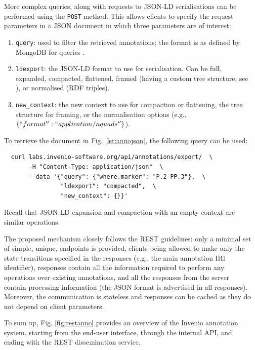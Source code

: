 More complex queries, along with requests to JSON-LD serialisations can be
performed using the \texttt{POST} method. This allows clients to specify the
request parameters in a JSON document in which three parameters are of interest:
\begin{enumerate}
  \item \texttt{query}: used to filter the retrieved annotations; the format is
                        as defined by MongoDB for queries \cite{ref:mongo}.
  \item \texttt{ldexport}: the JSON-LD format to use for serialisation. Can be
                           full, expanded, compacted, flattened, framed (having
                           a custom tree structure, see \cite{ref:jsonldframe}),
                           or normalised (RDF triples).
  \item \texttt{new\_context}: the new context to use for compaction or
                               flattening, the tree structure for framing, or
                               the normalisation options (e.g.,
                               $\{``format'': ``application/nquads''\}$).
\end{enumerate}

To retrieve the document in Fig. \ref{lst:annojson}, the following
query can be used:
\begin{verbatim}
  curl labs.invenio-software.org/api/annotations/export/  \
       -H "Content-Type: application/json"  \
       --data '{"query": {"where.marker": "P.2-PP.3"},  \
                "ldexport": "compacted",  \
                "new_context": {}}'
\end{verbatim}
Recall that JSON-LD expansion and compaction with an empty context are similar
operations.

The proposed mechanism closely follows the REST guidelines: only a minimal set
of simple, unique, endpoints is provided, clients being allowed to make only
the state transitions specified in the responses (e.g., the main annotation IRI
identifier), responses contain all the information required to perform any
operations over existing annotations, and all the responses from the server
contain processing information (the JSON format is advertised in all
responses).  Moreover, the communication is stateless and responses can be
cached as they do not depend on client parameters.

To sum up, Fig. \ref{fig:restanno} provides an overview of the Invenio
annotation system, starting from the end-user interface, through the internal
API, and ending with the REST dissemination service.

